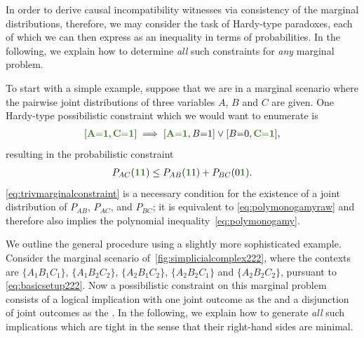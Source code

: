In order to derive causal incompatibility witnesses via consistency of the marginal distributions, therefore, we may consider the task of  Hardy-type paradoxes, each of which we can then express as an inequality in terms of probabilities. In the following, we explain how to determine \emph{all} such constraints for \emph{any} marginal problem.


To start with a simple example, suppose that we are in a marginal scenario where the pairwise joint distributions of three variables $A$, $B$ and $C$ are given. %
One Hardy-type possibilistic constraint which we would want to enumerate is
\begin{align}
   \bracks{\mgreen{A \eql 1}, \mgreen{C \eql 1}} \implies \bracks{\mgreen{A \eql 1}, B \eql 1} \lor \bracks{B \eql 0, \mgreen{C \eql 1}},
\end{align}
resulting in the probabilistic constraint
\begin{align}\label{eq:trivmarginalconstraint}
	P_{AC}(\mgreen{1 1}) \leq P_{AB}(\mgreen{1} 1) + P_{BC}(0 \mgreen{1}).
\end{align}
\cref{eq:trivmarginalconstraint} is a necessary condition for the existence of a joint distribution of $P_{A B}$, $P_{A C}$, and $P_{B C}$; it is equivalent to \cref{eq:polymonogamyraw} and therefore also implies the polynomial inequality~\cref{eq:polymonogamy}.

%

We outline the general procedure using a slightly more sophisticated example. Consider the marginal scenario of~\cref{fig:simplicialcomplex222}, where the contexts are $\{A_1 B_1 C_1\}$, $\{A_1 B_2 C_2\}$, $\{A_2 B_1 C_2\}$, $\{A_2 B_2 C_1\}$ and $\{A_2 B_2 C_2\}$, pursuant to \cref{eq:basicsetup222}.
Now a possibilistic constraint on this marginal problem consists of a logical implication with one joint outcome as the  and a disjunction of joint outcomes as the . In the following, we explain how to generate \emph{all} such implications which are tight in the sense that their right-hand sides are minimal.

